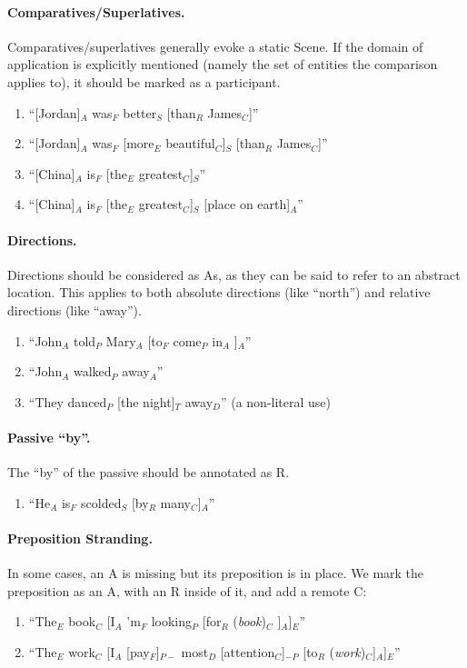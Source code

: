 \documentclass[11pt]{article}
\newcommand{\be}{\begin{enumerate}}
\newcommand{\ee}{\end{enumerate}}
\newcommand{\nss}[1]{}
\newcommand{\rem}[1]{{(\it #1})}
\begin{document}
\paragraph{Comparatives/Superlatives.} Comparatives/superlatives generally evoke a static Scene. If the domain of application is explicitly mentioned (namely the set of entities the comparison applies to), it should be marked as a participant.
\be
\item
``[Jordan]$_A$ was$_F$ better$_S$ [than$_R$ James$_C$]''
\item
``[Jordan]$_A$ was$_F$ [more$_E$ beautiful$_C$]$_S$ [than$_R$ James$_C$]''
\item
``[China]$_A$ is$_F$ [the$_E$ greatest$_C$]$_S$''
\item
``[China]$_A$ is$_F$ [the$_E$ greatest$_C$]$_S$ [place on earth]$_A$''
\ee

\paragraph{Directions.} Directions should be considered as As, as they can be said to refer to an abstract location. This applies to both absolute directions (like ``north'') and relative directions (like ``away''). \nss{not sure I find this intuitive; they feel more adverbial to me. sometimes there's a clear location that can be inferred in context (``she came in/out''---presumably we have a reference point from context) but not always. E.g., ``the bird flew up'' can simply mean the bird is ascending, without an implicit source or goal.}
\be
\item
``John$_A$ told$_P$ Mary$_A$ [to$_F$ come$_P$ in$_A$ ]$_A$''
\item
``John$_A$ walked$_P$ away$_A$''
\item
``They danced$_P$ [the night]$_T$ away$_D$'' (a non-literal use)
\ee

\paragraph{Passive ``by''.} The ``by'' of the passive should be annotated as R.
\be \item
``He$_A$ is$_F$ scolded$_S$ [by$_R$ many$_C$]$_A$''
\ee
\nss{What if there's no by-phrase: is it implicit?}

\paragraph{Preposition Stranding.} In some cases, an A is missing but its preposition is in place. We mark the preposition as an A, with an R inside of it, and add a remote C:
\be \item
``The$_E$ book$_C$ [I$_A$ 'm$_F$ looking$_P$ [for$_R$ \rem{book}$_C$ ]$_A$]$_E$''
\item
``The$_E$ work$_C$ [I$_A$ [pay$_F$]$_{P-}$ most$_D$ [attention$_C$]$_{-P}$
[to$_R$ \rem{work}$_C$]$_{A}$]$_E$''
\ee
\end{document}
